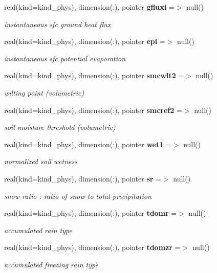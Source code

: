 \begin{DoxyCompactItemize}
real(kind=kind\+\_\+phys), dimension(\+:), pointer \textbf{ gfluxi} =$>$ null()
\begin{DoxyCompactList}\small\item\em instantaneous sfc ground heat flux \end{DoxyCompactList}\item 
real(kind=kind\+\_\+phys), dimension(\+:), pointer \textbf{ epi} =$>$ null()
\begin{DoxyCompactList}\small\item\em instantaneous sfc potential evaporation \end{DoxyCompactList}\item 
real(kind=kind\+\_\+phys), dimension(\+:), pointer \textbf{ smcwlt2} =$>$ null()
\begin{DoxyCompactList}\small\item\em wilting point (volumetric) \end{DoxyCompactList}\item 
real(kind=kind\+\_\+phys), dimension(\+:), pointer \textbf{ smcref2} =$>$ null()
\begin{DoxyCompactList}\small\item\em soil moisture threshold (volumetric) \end{DoxyCompactList}\item 
real(kind=kind\+\_\+phys), dimension(\+:), pointer \textbf{ wet1} =$>$ null()
\begin{DoxyCompactList}\small\item\em normalized soil wetness \end{DoxyCompactList}\item 
real(kind=kind\+\_\+phys), dimension(\+:), pointer \textbf{ sr} =$>$ null()
\begin{DoxyCompactList}\small\item\em snow ratio \+: ratio of snow to total precipitation \end{DoxyCompactList}\item 
real(kind=kind\+\_\+phys), dimension(\+:), pointer \textbf{ tdomr} =$>$ null()
\begin{DoxyCompactList}\small\item\em accumulated rain type \end{DoxyCompactList}\item 
real(kind=kind\+\_\+phys), dimension(\+:), pointer \textbf{ tdomzr} =$>$ null()
\begin{DoxyCompactList}\small\item\em accumulated freezing rain type \end{DoxyCompactList}\item 

\end{DoxyCompactItemize}
